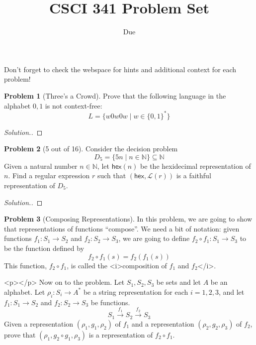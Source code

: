 \documentclass[11pt]{article}
\title{CSCI 341 Problem Set \pset}
\author{\subtitle}
\date{Due
    \duedate
}
\theoremstyle{theorem} %
\theoremstyle{definition} %
\newtheorem{problem}                    {{\color{BurntOrange}Problem}}
\theoremstyle{remark} %
\begin{document}
\maketitle

Don't forget to check the webspace for hints and additional context for each problem!

\begin{problem}
    [Three's a Crowd]
    Prove that the following language in the alphabet \(0,1\) is not context-free:
    \[
        L = \{w 0 w 0 w \mid w \in \{0,1\}^*\}
    \]
\end{problem}

\begin{proof}[Solution.]
    
\end{proof}

\begin{problem}
    [5 out of 16]
    Consider the decision problem 
    \[
        D_5 = \{5n \mid n \in \mathbb N\} \subseteq \mathbb{N}
    \]
    Given a natural number \(n\in \mathbb N\), let \(\mathsf{hex}(n)\) be the hexidecimal representation of \(n\). 
    Find a regular expression \(r\) such that \((\mathsf{hex}, \mathcal L(r))\) is a faithful representation of \(D_5\).
\end{problem}

\begin{proof}[Solution.]
    
\end{proof}

\begin{problem}
    [Composing Representations]
    In this problem, we are going to show that representations of functions ``compose''.
    We need a bit of notation: given functions \(f_1 \colon S_1 \to S_2\) and \(f_2 \colon S_2 \to S_3\), we are going to define \(f_2 \circ f_1 \colon S_1 \to S_3\) to be the function defined by 
    \[
        f_2 \circ f_1(s) = f_2(f_1(s))
    \]
    This function, \(f_2 \circ f_1\), is called the <i>composition of \(f_1\) and \(f_2\)</i>.

    <p></p>
    Now on to the problem.
    Let \(S_1,S_2,S_3\) be sets and let \(A\) be an alphabet.
    Let \(\rho_i \colon S_i \to A^*\) be a string representation for each \(i = 1,2,3\), and let \(f_1 \colon S_1 \to S_2\) and \(f_2 \colon S_2 \to S_3\) be functions. 
    \[
        S_1 \xrightarrow{f_1} S_2 \xrightarrow{f_2} S_3
    \]
    Given a representation \((\rho_1, g_1, \rho_2)\) of \(f_1\) and a representation \((\rho_2, g_2, \rho_3)\) of \(f_2\), prove that \((\rho_1, g_2 \circ g_1, \rho_3)\) is a representation of \(f_2 \circ f_1\).
\end{problem}
\end{document}
